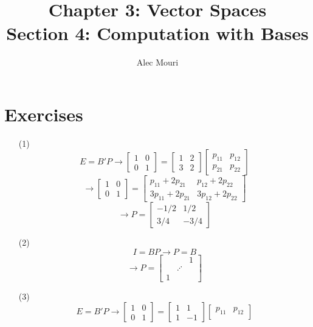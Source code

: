 \documentclass[12pt]{article}
\begin{document}
\title{Chapter 3: Vector Spaces \\ Section 4: Computation with Bases}
\author{Alec Mouri}

\maketitle
\section*{Exercises}
\begin{itemize}
\item[(1)]
$$E = B'P \rightarrow \begin{bmatrix}
1 & 0 \\
0 & 1
\end{bmatrix} = \begin{bmatrix}
1 & 2 \\
3 & 2
\end{bmatrix}\begin{bmatrix}
p_{11} & p_{12} \\
p_{21} & p_{22}
\end{bmatrix}$$
$$\rightarrow \begin{bmatrix}
1 & 0 \\
0 & 1
\end{bmatrix} = \begin{bmatrix}
p_{11} + 2p_{21} & p_{12} + 2p_{22} \\
3p_{11} + 2p_{21} & 3p_{12} + 2p_{22}
\end{bmatrix}$$
$$\rightarrow P = \begin{bmatrix}
-1/2 & 1/2 \\
3/4 & -3/4
\end{bmatrix}$$
\item[(2)]
$$I = BP \rightarrow P = B$$
$$\rightarrow P = \begin{bmatrix}
& & 1 \\
& \iddots \\
1
\end{bmatrix}$$
\item[(3)]
$$E = B'P \rightarrow \begin{bmatrix}
1 & 0 \\
0 & 1
\end{bmatrix} = \begin{bmatrix}
1 & 1 \\
1 & -1
\end{bmatrix}\begin{bmatrix}
p_{11} & p_{12} \\

\end{bmatrix}$$
\end{itemize}
\end{document}

